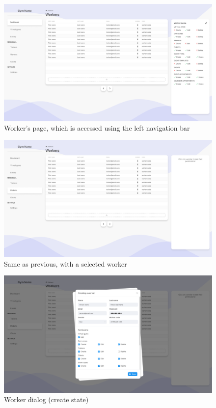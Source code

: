 \documentclass[a4paper, 12pt, oneside]{book}
\begin{document}
\begin{figure}[h!]
	\centering
	\includegraphics[width=\textwidth]{assets/ui/WorkersSelected.png}
	\caption{Worker's page, which is accessed using the left navigation bar}
\end{figure}
\begin{figure}[h!]
	\centering
	\includegraphics[width=\textwidth]{assets/ui/WorkersUnselected.png}
	\caption{Same as previous, with a selected worker}
\end{figure}
\begin{figure}[h!]
	\centering
	\includegraphics[width=\textwidth]{assets/ui/WorkersCreate.png}
	\caption{Worker dialog (create state)}
\end{figure}
\end{document}

